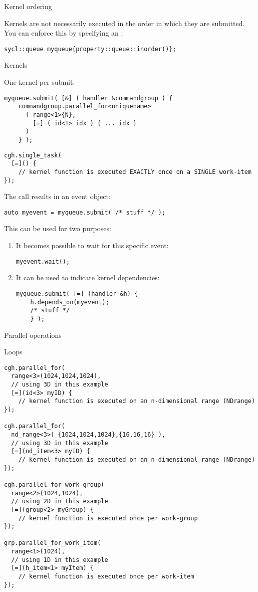  {Kernel ordering}

Kernels are not necessarily executed in the order in which they are submitted.
You can enforce this by specifying an :
\begin{lstlisting}
sycl::queue myqueue{property::queue::inorder()};
\end{lstlisting}

 {Kernels}

One kernel per submit.

\begin{lstlisting}
myqueue.submit( [&] ( handler &commandgroup ) {
    commandgroup.parallel_for<uniquename> 
      ( range<1>{N},
        [=] ( id<1> idx ) { ... idx }
      )
    } );
\end{lstlisting}

\begin{lstlisting}
cgh.single_task(
  [=]() {
    // kernel function is executed EXACTLY once on a SINGLE work-item
});
\end{lstlisting}

The  call results in an event object:
\begin{lstlisting}
auto myevent = myqueue.submit( /* stuff */ );
\end{lstlisting}
This can be used for two purposes:
\begin{enumerate}
\item It becomes possible to wait for this specific event:
\begin{lstlisting}
myevent.wait();    
\end{lstlisting}
\item It can be used to indicate kernel dependencies:
\begin{lstlisting}
myqueue.submit( [=] (handler &h) {
    h.depends_on(myevent);
    /* stuff */
    } );
\end{lstlisting}
\end{enumerate}

 {Parallel operations}

 {Loops}
  
\begin{lstlisting}
cgh.parallel_for(
  range<3>(1024,1024,1024),
  // using 3D in this example
  [=](id<3> myID) {
    // kernel function is executed on an n-dimensional range (NDrange)
});

cgh.parallel_for(
  nd_range<3>( {1024,1024,1024},{16,16,16} ),
  // using 3D in this example 
  [=](nd_item<3> myID) {
    // kernel function is executed on an n-dimensional range (NDrange)
});

cgh.parallel_for_work_group(
  range<2>(1024,1024),
  // using 2D in this example
  [=](group<2> myGroup) {
    // kernel function is executed once per work-group
});

grp.parallel_for_work_item(
  range<1>(1024),
  // using 1D in this example
  [=](h_item<1> myItem) {
    // kernel function is executed once per work-item
});
\end{lstlisting}

